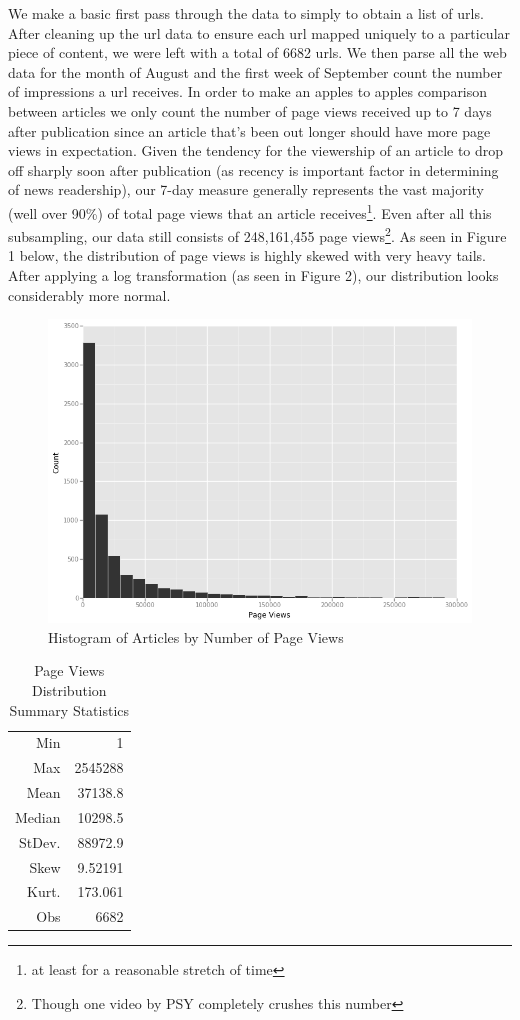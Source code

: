 \documentclass[fleqn,12pt]{SelfArx} %
\begin{document}
We make a basic first pass through the data to simply to obtain a list of urls. After cleaning up the url data to ensure each url mapped uniquely to a particular piece of content, we were left with a total of 6682 urls. We then parse all the web data for the month of August and the first week of September count the number of impressions a url receives. In order to make an apples to apples comparison between articles we only count the number of page views received up to 7 days after publication since an article that's been out longer should have more page views in expectation. Given the tendency for the viewership of an article to drop off sharply soon after publication (as recency is important factor in determining of news readership), our 7-day measure generally represents the vast majority (well over 90\%) of total page views that an article receives\footnote{at least for a reasonable stretch of time}. Even after all this subsampling, our data still consists of 248,161,455 page views\footnote{Though one video by PSY completely crushes this number}. As seen in Figure 1 below, the distribution of page views is highly skewed with very heavy tails. After applying a log transformation (as seen in Figure 2), our distribution looks considerably more normal. 

\begin{figure}[ht]\centering
\includegraphics[width=\linewidth]{pageviews_hist}
\caption{Histogram of Articles by Number of Page Views}
\label{fig:pv_hist}
\end{figure}
\begin{table}[hbt]
\caption{Page Views Distribution Summary Statistics}
\centering
\begin{tabular}{rr}
\toprule
Min               &  1\\
Max               &  2545288\\  
Mean              &  37138.8\\
Median            &  10298.5\\
StDev.         &  88972.9\\
Skew          &  9.52191\\
Kurt.          &  173.061\\
\midrule
Obs &  6682\\
\bottomrule
\end{tabular}
\end{table}
\end{document}
